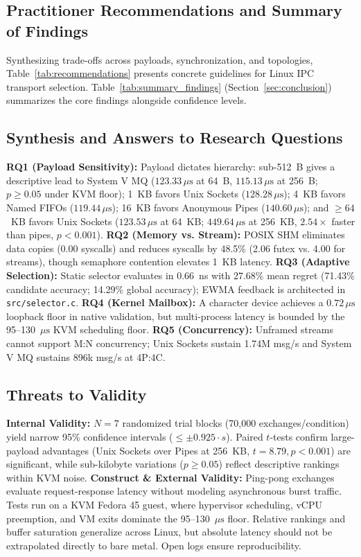 \subsection{Practitioner Recommendations and Summary of Findings}

Synthesizing trade-offs across payloads, synchronization, and topologies, Table~\ref{tab:recommendations} presents concrete guidelines for Linux IPC transport selection. Table~\ref{tab:summary_findings} (Section~\ref{sec:conclusion}) summarizes the core findings alongside confidence levels.

\subsection{Synthesis and Answers to Research Questions}
\textbf{RQ1 (Payload Sensitivity):} Payload dictates hierarchy: sub-512~B gives a descriptive lead to System V MQ ($123.33\,\mu\text{s}$ at 64~B, $115.13\,\mu\text{s}$ at 256~B; $p \ge 0.05$ under KVM floor); 1~KB favors Unix Sockets ($128.28\,\mu\text{s}$); 4~KB favors Named FIFOs ($119.44\,\mu\text{s}$); 16~KB favors Anonymous Pipes ($140.60\,\mu\text{s}$); and $\ge 64$~KB favors Unix Sockets ($123.53\,\mu\text{s}$ at 64~KB; $449.64\,\mu\text{s}$ at 256~KB, $2.54\times$ faster than pipes, $p < 0.001$).
\textbf{RQ2 (Memory vs. Stream):} POSIX SHM eliminates data copies (0.00 syscalls) and reduces syscalls by 48.5\% (2.06 futex vs. 4.00 for streams), though semaphore contention elevates 1~KB latency.
\textbf{RQ3 (Adaptive Selection):} Static selector evaluates in 0.66~ns with 27.68\% mean regret (71.43\% candidate accuracy; 14.29\% global accuracy); EWMA feedback is architected in \texttt{src/selector.c}.
\textbf{RQ4 (Kernel Mailbox):} A character device achieves a $0.72\,\mu\text{s}$ loopback floor in native validation, but multi-process latency is bounded by the 95--130~$\mu\text{s}$ KVM scheduling floor.
\textbf{RQ5 (Concurrency):} Unframed streams cannot support M:N concurrency; Unix Sockets sustain 1.74M msg/s and System V MQ sustains 896k msg/s at 4P:4C.

\subsection{Threats to Validity}
\textbf{Internal Validity:} $N = 7$ randomized trial blocks (70,000 exchanges/condition) yield narrow 95\% confidence intervals ($\le \pm 0.925 \cdot s$). Paired $t$-tests confirm large-payload advantages (Unix Sockets over Pipes at 256~KB, $t=8.79, p < 0.001$) are significant, while sub-kilobyte variations ($p \ge 0.05$) reflect descriptive rankings within KVM noise.
\textbf{Construct \& External Validity:} Ping-pong exchanges evaluate request-response latency without modeling asynchronous burst traffic. Tests run on a KVM Fedora 45 guest, where hypervisor scheduling, vCPU preemption, and VM exits dominate the 95--130~$\mu\text{s}$ floor. Relative rankings and buffer saturation generalize across Linux, but absolute latency should not be extrapolated directly to bare metal. Open logs ensure reproducibility.
